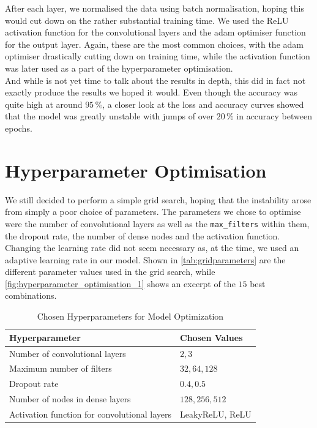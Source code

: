 After each layer, we normalised the data using batch normalisation, hoping this would cut down on the rather substantial training time.
We used the ReLU activation function for the convolutional layers and the adam optimiser function for the output layer.
Again, these are the most common choices, with the adam optimiser drastically cutting down on training time, 
while the activation function was later used as a part of the hyperparameter optimisation. \\

And while is not yet time to talk about the results in depth, this did in fact not exactly produce the results we hoped it would.
Even though the accuracy was quite high at around $95 \,\%$, a closer look at the loss and accuracy curves showed that the model was greatly unstable
with jumps of over $20 \,\%$ in accuracy between epochs.


\section{Hyperparameter Optimisation}
\label{sec:results}

We still decided to perform a simple grid search, hoping that the instability arose from simply a poor choice of parameters.
The parameters we chose to optimise were the number of convolutional layers as well as the \texttt{max\_filters} within them, the dropout rate, the number of dense nodes
and the activation function.
Changing the learning rate did not seem necessary as, at the time, we used an adaptive learning rate in our model. 
Shown in \autoref{tab:gridparameters} are the different parameter values used in the grid search, while \autoref{fig:hyperparameter_optimisation_1} 
shows an excerpt of the $15$ best combinations. \\

\begin{table}[H]
    \centering
    \begin{tabular}{ll}
        \toprule
        \textbf{Hyperparameter} & \textbf{Chosen Values} \\
        \midrule
        Number of convolutional layers               & {$2, 3$}\\
        Maximum number of filters                    & {$32, 64, 128$}\\
        Dropout rate                                 & {$0.4, 0.5$}\\
        Number of nodes in dense layers              & {$128, 256, 512$}\\
        Activation function for convolutional layers & {LeakyReLU, ReLU}\\
        \bottomrule
    \end{tabular}
    \caption{Chosen Hyperparameters for Model Optimization}
    \label{tab:hyperparameters}
\end{table}

